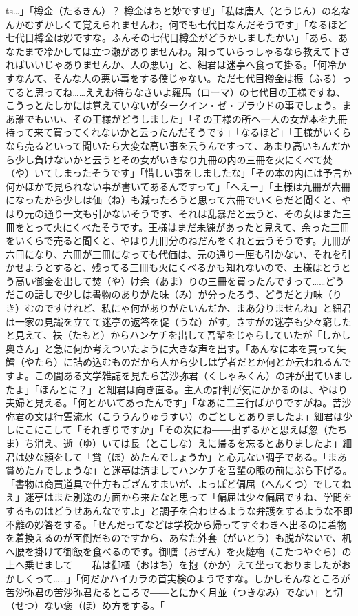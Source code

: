 \documentclass{book}
\begin{document}
ts{}\ldots{}」「樽金（たるきん）？ 樽金はちと妙ですぜ」「私は唐人（とうじん）の名なんかむずかしくて覚えられませんわ。何でも七代目なんだそうです」「なるほど七代目樽金は妙ですな。ふんその七代目樽金がどうかしましたかい」「あら、あなたまで冷かしては立つ瀬がありませんわ。知っていらっしゃるなら教えて下さればいいじゃありませんか、人の悪い」と、細君は迷亭へ食って掛る。「何冷かすなんて、そんな人の悪い事をする僕じゃない。ただ七代目樽金は振（ふる）ってると思ってね\ldots{}\ldots{}ええお待ちなさいよ羅馬（ローマ）の七代目の王様ですね、こうっとたしかには覚えていないがタークイン・ゼ・プラウドの事でしょう。まあ誰でもいい、その王様がどうしました」「その王様の所へ一人の女が本を九冊持って来て買ってくれないかと云ったんだそうです」「なるほど」「王様がいくらなら売るといって聞いたら大変な高い事を云うんですって、あまり高いもんだから少し負けないかと云うとその女がいきなり九冊の内の三冊を火にくべて焚（や）いてしまったそうです」「惜しい事をしましたな」「その本の内には予言か何かほかで見られない事が書いてあるんですって」「へえー」「王様は九冊が六冊になったから少しは価（ね）も減ったろうと思って六冊でいくらだと聞くと、やはり元の通り一文も引かないそうです、それは乱暴だと云うと、その女はまた三冊をとって火にくべたそうです。王様はまだ未練があったと見えて、余った三冊をいくらで売ると聞くと、やはり九冊分のねだんをくれと云うそうです。九冊が六冊になり、六冊が三冊になっても代価は、元の通り一厘も引かない、それを引かせようとすると、残ってる三冊も火にくべるかも知れないので、王様はとうとう高い御金を出して焚（や）け余（あま）りの三冊を買ったんですって\ldots{}\ldots{}どうだこの話しで少しは書物のありがた味（み）が分ったろう、どうだと力味（りき）むのですけれど、私にゃ何がありがたいんだか、まあ分りませんね」と細君は一家の見識を立てて迷亭の返答を促（うな）がす。さすがの迷亭も少々窮したと見えて、袂（たもと）からハンケチを出して吾輩をじゃらしていたが「しかし奥さん」と急に何か考えついたように大きな声を出す。「あんなに本を買って矢鱈（やたら）に詰め込むものだから人から少しは学者だとか何とか云われるんですよ。この間ある文学雑誌を見たら苦沙弥君（くしゃみくん）の評が出ていましたよ」「ほんとに？」と細君は向き直る。主人の評判が気にかかるのは、やはり夫婦と見える。「何とかいてあったんです」「なあに二三行ばかりですがね。苦沙弥君の文は行雲流水（こううんりゅうすい）のごとしとありましたよ」細君は少しにこにこして「それぎりですか」「その次にね――出ずるかと思えば忽（たちま）ち消え、逝（ゆ）いては長（とこしな）えに帰るを忘るとありましたよ」細君は妙な顔をして「賞（ほ）めたんでしょうか」と心元ない調子である。「まあ賞めた方でしょうな」と迷亭は済ましてハンケチを吾輩の眼の前にぶら下げる。「書物は商買道具で仕方もござんすまいが、よっぽど偏屈（へんくつ）でしてねえ」迷亭はまた別途の方面から来たなと思って「偏屈は少々偏屈ですね、学問をするものはどうせあんなですよ」と調子を合わせるような弁護をするような不即不離の妙答をする。「せんだってなどは学校から帰ってすぐわきへ出るのに着物を着換えるのが面倒だものですから、あなた外套（がいとう）も脱がないで、机へ腰を掛けて御飯を食べるのです。御膳（おぜん）を火燵櫓（こたつやぐら）の上へ乗せまして――私は御櫃（おはち）を抱（かか）えて坐っておりましたがおかしくって\ldots{}\ldots{}」「何だかハイカラの首実検のようですな。しかしそんなところが苦沙弥君の苦沙弥君たるところで――とにかく月並（つきなみ）でない」と切（せつ）ない褒（ほ）め方をする。「
\end{document}
